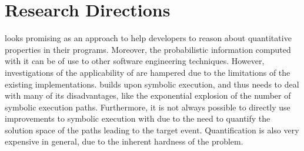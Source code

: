 \documentclass[10pt]{article}
\newcounter{list}
\begin{document}

\section{Research Directions}
\label{research}

\PSE{} looks promising as an approach to help developers to reason
about quantitative properties in their programs. Moreover, the
probabilistic information computed with it can be of use to other
software engineering techniques. However, investigations of the
applicability of \PSE{} are hampered due to the limitations of the
existing implementations. \PSE{} builds upon symbolic execution, and
thus needs to deal with many of its disadvantages, like the
exponential explosion of the number of symbolic execution
paths. Furthermore, it is not always possible to directly use
improvements to symbolic execution with \PSE{} due to the need to
quantify the solution space of the paths leading to the target
event. Quantification is also very expensive in general, due to the
inherent hardness of the problem.



\end{document}
